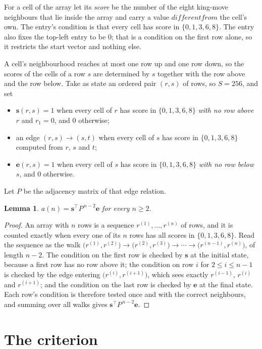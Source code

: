 \documentclass[11pt,a4paper]{article}
\theoremstyle{plain}
\newtheorem{lemma}[theorem]{Lemma}
\theoremstyle{definition}
\begin{document}
For a cell of the array let its \emph{score} be the number of the eight king-move neighbours that lie inside
the array and carry a value $different from$ the cell's own. The entry's condition is that every cell
has score in $\{0,1,3,6,8\}$. The entry also fixes the top-left entry to be $0$; that is a condition on the first row alone, so it restricts the start vector and nothing else.

A cell's neighbourhood reaches at most one row up and one row down, so the scores of the
cells of a row $s$ are determined by $s$ together with the row above and the row below.
Take as state an ordered pair $(r,s)$ of rows, so $S=256$, and set
\begin{itemize}
\item $\mathbf{s}(r,s)=1$ when every cell of $r$ has score in $\{0,1,3,6,8\}$ \emph{with no row
above $r$} and $r_1=0$, and $0$ otherwise;
\item an edge $(r,s)\to(s,t)$ when every cell of $s$ has score in $\{0,1,3,6,8\}$ computed from
$r$, $s$ and $t$;
\item $\mathbf{e}(r,s)=1$ when every cell of $s$ has score in $\{0,1,3,6,8\}$ \emph{with no row
below $s$}, and $0$ otherwise.
\end{itemize}
Let $P$ be the adjacency matrix of that edge relation.

\begin{lemma}\label{lem:walk}
$a(n)=\mathbf{s}^{\!\top}P^{\,n-2}\mathbf{e}$ for every $n\ge2$.
\end{lemma}

\begin{proof}
An array with $n$ rows is a sequence $r^{(1)},\dots,r^{(n)}$ of rows, and it is counted
exactly when every one of its $n$ rows has all scores in $\{0,1,3,6,8\}$. Read the sequence as the
walk $\bigl(r^{(1)},r^{(2)}\bigr)\to\bigl(r^{(2)},r^{(3)}\bigr)\to\cdots\to
\bigl(r^{(n-1)},r^{(n)}\bigr)$, of length $n-2$. The condition on the first row is
checked by $\mathbf{s}$ at the initial state, because a first row has no row above it; the
condition on row $i$ for $2\le i\le n-1$ is checked by the edge entering
$\bigl(r^{(i)},r^{(i+1)}\bigr)$, which sees exactly $r^{(i-1)}$, $r^{(i)}$ and
$r^{(i+1)}$; and the condition on the last row is checked by $\mathbf{e}$ at the final
state. Each row's condition is therefore tested once and with the correct neighbours, and
summing over all walks gives $\mathbf{s}^{\!\top}P^{\,n-2}\mathbf{e}$.
\end{proof}

\section{The criterion}
\end{document}
